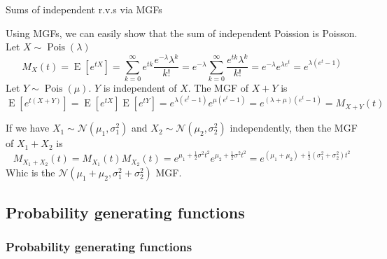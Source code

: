 \documentclass[8pt]{beamer}
\newcommand{\mypois}[1]{\operatorname{Pois}(#1)}
\newcommand{\expec}[1]{\operatorname{E}\left[ #1 \right]}
\begin{document}
\begin{frame}{Sums of independent r.v.s via MGFs}
    \begin{example}
        Using MGFs, we can easily show that the sum of independent Poission is Poisson.
        Let $X \sim \mypois{\lambda}$
        \[
        M_X(t) = \expec{e^{tX}} = \sum_{k=0}^\infty e^{tk} \frac{e^{-\lambda}\lambda^k}{k!} = e^{-\lambda} \sum_{k=0}^\infty \frac{e^{tk} \lambda^k}{k!} = e^{-\lambda} e^{\lambda e^t} = e^{\lambda (e^t - 1)}
        \]
        Let $Y \sim \mypois{\mu}$. $Y$ is independent of $X$. The MGF of $X+Y$ is
        \[
            \expec{e^{t(X+Y)}} = \expec{e^{tX}} \expec{e^{tY}} =e^{\lambda (e^t -1)} e^{\mu (e^t -1)} =e^{(\lambda + \mu)(e^t -1)} = M_{X+Y}(t) 
        \]
    \end{example}

    \begin{example}
        If we have $X_1\sim \mathcal{N}(\mu_1, \sigma_1^2)$ and $X_2 \sim \mathcal{N}(\mu_2, \sigma_2^2)$ independently, then the MGF of $X_1 + X_2$ is 
        \[
            M_{X_1+X_2}(t) = M_{X_1}(t) M_{X_2}(t) = e^{\mu_1 + \frac{1}{2}\sigma^2 t^2} e^{\mu_2 + \frac{1}{2}\sigma^2 t^2} = e^{(\mu_1 + \mu_2) + \frac{1}{2}(\sigma_1^2+ \sigma_2^2)t^2}
        \]
        Whic is the $\mathcal{N}(\mu_1 + \mu_2, \sigma_1^2 + \sigma_2^2)$ MGF.
    \end{example}
\end{frame}

\subsection{Probability generating functions}

\begin{frame}
    \frametitle{Probability generating functions}
    \tableofcontents[currentsubsection]
\end{frame}
\end{document}
